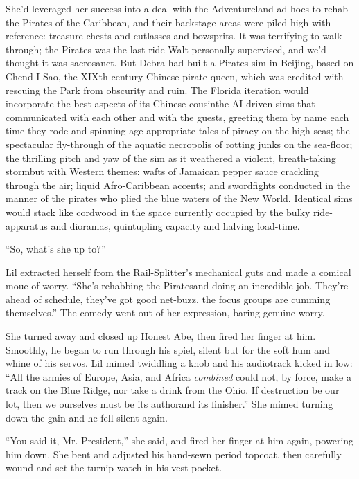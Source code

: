 She'd leveraged her success into a deal with the Adventureland
ad-hocs to rehab the Pirates of the Caribbean, and their backstage
areas were piled high with reference: treasure chests and cutlasses
and bowsprits. It was terrifying to walk through; the Pirates was
the last ride Walt personally supervised, and we'd thought it was
sacrosanct. But Debra had built a Pirates sim in Beijing, based on
Chend I Sao, the XIXth century Chinese pirate queen, which was
credited with rescuing the Park from obscurity and ruin. The
Florida iteration would incorporate the best aspects of its Chinese
cousin{\dash}the AI-driven sims that communicated with each other and
with the guests, greeting them by name each time they rode and
spinning age-appropriate tales of piracy on the high seas; the
spectacular fly-through of the aquatic necropolis of rotting junks
on the sea-floor; the thrilling pitch and yaw of the sim as it
weathered a violent, breath-taking storm{\dash}but with Western themes:
wafts of Jamaican pepper sauce crackling through the air; liquid
Afro-Caribbean accents; and swordfights conducted in the manner of
the pirates who plied the blue waters of the New World. Identical
sims would stack like cordwood in the space currently occupied by
the bulky ride-apparatus and dioramas, quintupling capacity and
halving load-time.

“So, what's she up to?”

Lil extracted herself from the Rail-Splitter's mechanical guts and
made a comical moue of worry. “She's rehabbing the Pirates{\dash}and
doing an incredible job. They're ahead of schedule, they've got
good net-buzz, the focus groups are cumming themselves.” The comedy
went out of her expression, baring genuine worry.

She turned away and closed up Honest Abe, then fired her finger at
him. Smoothly, he began to run through his spiel, silent but for
the soft hum and whine of his servos. Lil mimed twiddling a knob
and his audiotrack kicked in low: “All the armies of Europe, Asia,
and Africa \emph{combined} could not, by force, make a track on the
Blue Ridge, nor take a drink from the Ohio. If destruction be our
lot, then we ourselves must be its author{\dash}and its finisher.” She
mimed turning down the gain and he fell silent again.

“You said it, Mr. President,” she said, and fired her finger at him
again, powering him down. She bent and adjusted his hand-sewn
period topcoat, then carefully wound and set the turnip-watch in
his vest-pocket.

